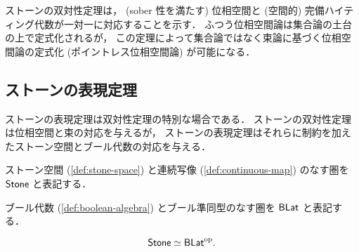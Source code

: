 \documentclass[titlepage]{ltjsreport}
\newtheorem[S]{theorem}{定理}[chapter]
\newtheorem[S]{definition}[theorem]{定義}
\newtheorem[S]{example}[theorem]{例}
\begin{document}
ストーンの双対性定理は，
(sober 性を満たす)
位相空間と
(空間的)
完備ハイティング代数が一対一に対応することを示す．
ふつう位相空間論は集合論の土台の上で定式化されるが，
この定理によって集合論ではなく束論に基づく位相空間論の定式化
(ポイントレス位相空間論)
が可能になる．

\subsection{ストーンの表現定理}

ストーンの表現定理は双対性定理の特別な場合である．
ストーンの双対性定理は位相空間と束の対応を与えるが，
ストーンの表現定理はそれらに制約を加えたストーン空間とブール代数の対応を与える．

\begin{definition}[ストーン空間の圏]
  ストーン空間
  (\cref{def:stone-space})
  と連続写像
  (\cref{def:continuous-map})
  のなす圏を $\mathsf{Stone}$ と表記する．
\end{definition}

\begin{definition}[ブール代数の圏]
  ブール代数 (\cref{def:boolean-algebra})
  とブール準同型のなす圏を $\mathsf{BLat}$ と表記する．
\end{definition}

\newcommand{\spec}{\operatorname{spec}}
\newcommand{\clop}{\operatorname{clop}}

\begin{theorem}[ストーンの表現定理]
  \begin{equation}
    \mathsf{Stone}\simeq\mathsf{BLat}^\mathrm{op}.
  \end{equation}
\end{theorem}
\end{document}
